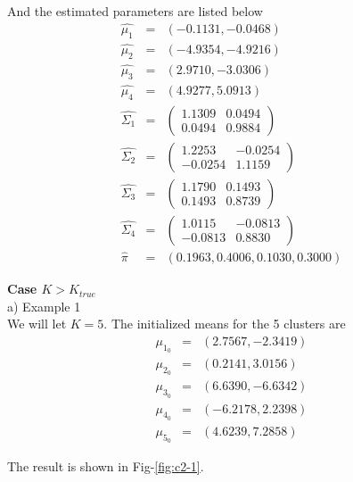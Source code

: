 \documentclass[12pt]{article}
\begin{document}
And the estimated parameters are listed below
\begin{eqnarray*}
\hat{\mu_1} &=& (-0.1131,   -0.0468) \\
\hat{\mu_2} &=& (-4.9354,   -4.9216) \\
\hat{\mu_3} &=& (2.9710,   -3.0306) \\
\hat{\mu_4} &=& (4.9277,    5.0913) \\
\hat{\Sigma_1} &=&
  \begin{pmatrix}
    1.1309  &  0.0494 \\
    0.0494  &  0.9884
  \end{pmatrix} \\
\hat{\Sigma_2} &=& 
  \begin{pmatrix}
    1.2253  & -0.0254 \\
   -0.0254  &  1.1159
  \end{pmatrix} \\
\hat{\Sigma_3} &=&
  \begin{pmatrix}
    1.1790  &  0.1493 \\
    0.1493  &  0.8739
  \end{pmatrix} \\
\hat{\Sigma_4} &=& 
  \begin{pmatrix}
    1.0115  & -0.0813 \\
   -0.0813  &  0.8830
  \end{pmatrix} \\
\hat{\pi} &=& (0.1963, 0.4006, 0.1030, 0.3000)
\end{eqnarray*}

\textbf{Case $K > K_{true}$} \\

a) Example 1 \\

We will let $K = 5$. The initialized means for the 5 clusters are
\begin{eqnarray*}
\mu_{1_0} &=& (2.7567,   -2.3419) \\
\mu_{2_0} &=& (0.2141,    3.0156) \\
\mu_{3_0} &=& (6.6390,   -6.6342) \\
\mu_{4_0} &=& (-6.2178,    2.2398) \\
\mu_{5_0} &=& (4.6239,    7.2858)
\end{eqnarray*}

The result is shown in Fig-\ref{fig:c2-1}. \\
\end{document}
